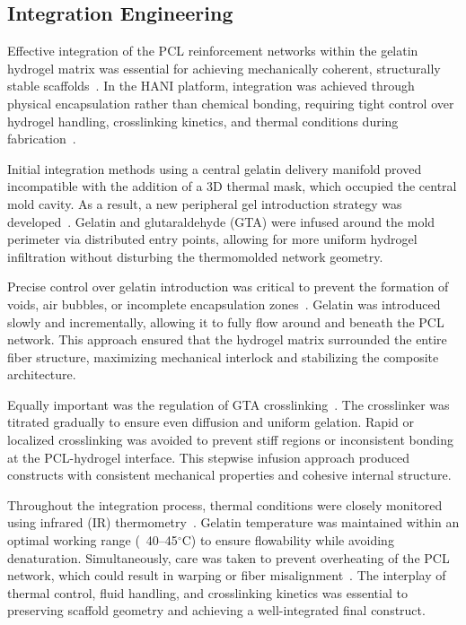 \subsection{Integration Engineering}

Effective integration of the PCL reinforcement networks within the gelatin hydrogel matrix was essential for achieving mechanically coherent, structurally stable scaffolds~\cite{elkommos2025hybridhydrogels}. In the HANI platform, integration was achieved through physical encapsulation rather than chemical bonding, requiring tight control over hydrogel handling, crosslinking kinetics, and thermal conditions during fabrication~\cite{ahmed2015hydrogelpreparation}.

Initial integration methods using a central gelatin delivery manifold proved incompatible with the addition of a 3D thermal mask, which occupied the central mold cavity. As a result, a new peripheral gel introduction strategy was developed~\cite{elkommos2024developmentimproved,elkommos2025hybridhydrogels}. Gelatin and glutaraldehyde (GTA) were infused around the mold perimeter via distributed entry points, allowing for more uniform hydrogel infiltration without disturbing the thermomolded network geometry.

Precise control over gelatin introduction was critical to prevent the formation of voids, air bubbles, or incomplete encapsulation zones~\cite{chaudhuri2016hydrogelstunable}. Gelatin was introduced slowly and incrementally, allowing it to fully flow around and beneath the PCL network. This approach ensured that the hydrogel matrix surrounded the entire fiber structure, maximizing mechanical interlock and stabilizing the composite architecture.

Equally important was the regulation of GTA crosslinking~\cite{sung1999evaluationgelatin}. The crosslinker was titrated gradually to ensure even diffusion and uniform gelation. Rapid or localized crosslinking was avoided to prevent stiff regions or inconsistent bonding at the PCL-hydrogel interface. This stepwise infusion approach produced constructs with consistent mechanical properties and cohesive internal structure.

Throughout the integration process, thermal conditions were closely monitored using infrared (IR) thermometry~\cite{bigimechanicalthermal}. Gelatin temperature was maintained within an optimal working range (~40--45$^\circ$C) to ensure flowability while avoiding denaturation. Simultaneously, care was taken to prevent overheating of the PCL network, which could result in warping or fiber misalignment~\cite{woodruff2010returnforgotten}. The interplay of thermal control, fluid handling, and crosslinking kinetics was essential to preserving scaffold geometry and achieving a well-integrated final construct.

